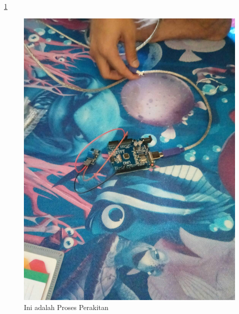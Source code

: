 \documentclass{article}
\begin{document}
  \ref{ar4}
  \begin{figure}[ht]
  \centerline{\includegraphics[width=1\textwidth]{../figures/ar4.jpg}}
  \caption{Ini adalah Proses Perakitan}
  \label{ar4}
  \end{figure}
\end{document}
